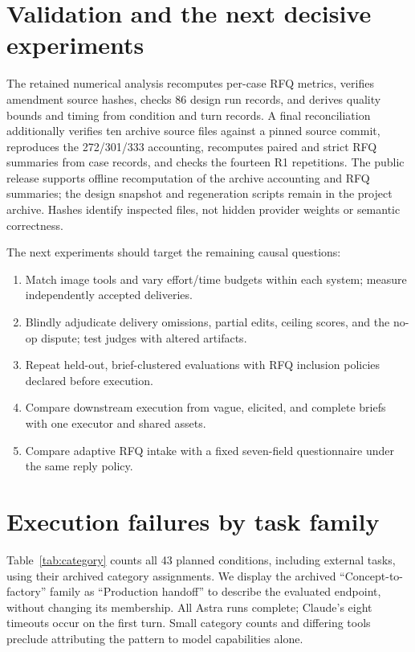 \section{Validation and the next decisive experiments}
\label{app:todo}
The retained numerical analysis recomputes per-case RFQ metrics, verifies amendment source hashes, checks 86 design run records, and derives quality bounds and timing from condition and turn records. A final reconciliation additionally verifies ten archive source files against a pinned source commit, reproduces the 272/301/333 accounting, recomputes paired and strict RFQ summaries from case records, and checks the fourteen R1 repetitions. The public release supports offline recomputation of the archive accounting and RFQ summaries; the design snapshot and regeneration scripts remain in the project archive. Hashes identify inspected files, not hidden provider weights or semantic correctness.

The next experiments should target the remaining causal questions:
\begin{enumerate}
\item Match image tools and vary effort/time budgets within each system; measure independently accepted deliveries.
\item Blindly adjudicate delivery omissions, partial edits, ceiling scores, and the no-op dispute; test judges with altered artifacts.
\item Repeat held-out, brief-clustered evaluations with RFQ inclusion policies declared before execution.
\item Compare downstream execution from vague, elicited, and complete briefs with one executor and shared assets.
\item Compare adaptive RFQ intake with a fixed seven-field questionnaire under the same reply policy.
\end{enumerate}



\section{Execution failures by task family}
\label{app:category}
Table~\ref{tab:category} counts all 43 planned conditions, including external tasks, using their archived category assignments. We display the archived ``Concept-to-factory'' family as ``Production handoff'' to describe the evaluated endpoint, without changing its membership. All Astra runs complete; Claude's eight timeouts occur on the first turn. Small category counts and differing tools preclude attributing the pattern to model capabilities alone.

